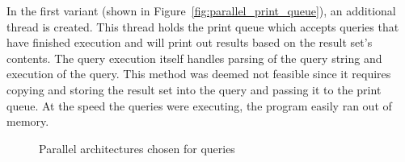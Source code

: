 \documentclass[11pt,journal,compsoc]{IEEEtran}
\begin{document}
In the first variant (shown in Figure~\ref{fig:parallel_print_queue}), an additional thread is created. This thread holds the print queue which accepts queries that have finished execution and will print out results based on the result set’s contents. The query execution itself handles parsing of the query string and execution of the query. This method was deemed not feasible since it requires copying and storing the result set into the query and passing it to the print queue. At the speed the queries were executing, the program easily ran out of memory.

\begin{figure}
\captionsetup{justification=centering}
\centerline{
\hfill
{}}
\caption{Parallel architectures chosen for queries}
\label{fig:parallel_query}
\end{figure} 
\end{document}
